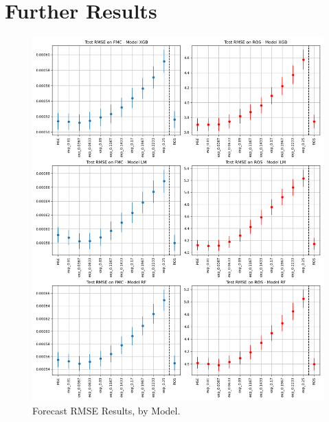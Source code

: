 \documentclass[11pt]{article}%
\begin{document}
\section{Further Results}
\label{app:res}

\begin{figure}[ht]
    \centering
    \includegraphics[width=1\textwidth]{images/results2.png}
    \caption{Forecast RMSE Results, by Model.}
    \label{fig:results2}
\end{figure}
\end{document}
